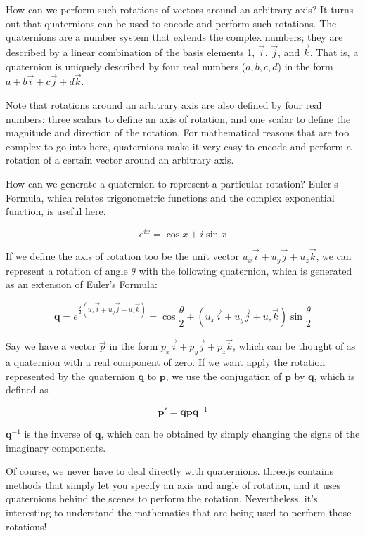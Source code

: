 \documentclass[12pt]{article}
\begin{document}
How can we perform such rotations of vectors around an arbitrary axis? It turns out that quaternions can be used to encode and perform such rotations. The quaternions are a number system that extends the complex numbers; they are described by a linear combination of the basis elements 1, $\vec{i}$, $\vec{j}$, and $\vec{k}$. That is, a quaternion is uniquely described by four real numbers ($a, b, c, d$) in the form $a+b\vec{i}+c\vec{j}+d\vec{k}$.

Note that rotations around an arbitrary axis are also defined by four real numbers: three scalars to define an axis of rotation, and one scalar to define the magnitude and direction of the rotation. For mathematical reasons that are too complex to go into here, quaternions make it very easy to encode and perform a rotation of a certain vector around an arbitrary axis.

How can we generate a quaternion to represent a particular rotation? Euler's Formula, which relates trigonometric functions and the complex exponential function, is useful here.

\[ e^{ix}=\cos{x}+i\sin{x} \]

If we define the axis of rotation too be the unit vector $u_x\vec{i} + u_y\vec{j}+u_z\vec{k}$, we can represent a rotation of angle $\theta$  with the following quaternion, which is generated as an extension of Euler's Formula:

\[ \mathbf{q} = e^{\frac{\theta}{2}(u_x\vec{i} + u_y\vec{j}+u_z\vec{k})} = \cos{\frac{\theta}{2}} + (u_x\vec{i} + u_y\vec{j}+u_z\vec{k})\sin{\frac{\theta}{2}} \]

Say we have a vector $\vec{p}$ in the form $p_x\vec{i} + p_y\vec{j} + p_z\vec{k}$, which can be thought of as a quaternion with a real component of zero. If we want apply the rotation represented by the quaternion $\mathbf{q}$ to $\mathbf{p}$, we use the conjugation of $\mathbf{p}$ by $\mathbf{q}$, which is defined as

\[ \mathbf{p}\prime = \mathbf{qpq}^{-1} \]

$\mathbf{q}^{-1}$ is the inverse of $\mathbf{q}$, which can be obtained by simply changing the signs of the imaginary components.

Of course, we never have to deal directly with quaternions. three.js contains methods that simply let you specify an axis and angle of rotation, and it uses quaternions behind the scenes to perform the rotation. Nevertheless, it's interesting to understand the mathematics that are being used to perform those rotations!
\end{document}
